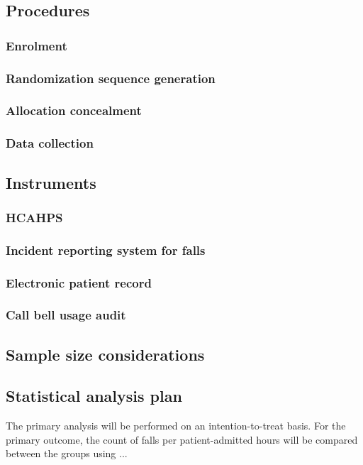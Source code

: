 \documentclass[12pt]{article}
\begin{document}
\subsection{Procedures}

\subsubsection{Enrolment}

\subsubsection{Randomization sequence generation}

\subsubsection{Allocation concealment}

\subsubsection{Data collection}

\subsection{Instruments}

\subsubsection{HCAHPS}
\subsubsection{Incident reporting system for falls}
\subsubsection{Electronic patient record}
\subsubsection{Call bell usage audit}

\subsection{Sample size considerations}

\subsection{Statistical analysis plan}
The primary analysis will be performed on an intention-to-treat basis. For the primary outcome, the count of falls per patient-admitted hours will be compared between the groups using ...
\end{document}
